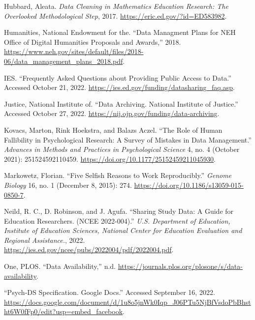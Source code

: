 \documentclass[
]{book}
\newlength{\cslhangindent}
\newlength{\cslentryspacingunit} %
\newenvironment{CSLReferences}[2] %
 {%
  \setlength{\parindent}{0pt}
  \ifodd #1
  \let\oldpar\par
  \def\par{\hangindent=\cslhangindent\oldpar}
  \fi
  \setlength{\parskip}{#2\cslentryspacingunit}
 }%
 {}
\begin{document}
\begin{CSLReferences}{1}{0}
\leavevmode{}%
Hubbard, Aleata. \emph{Data Cleaning in Mathematics Education Research: The Overlooked Methodological Step}, 2017. \url{https://eric.ed.gov/?id=ED583982}.

\leavevmode{}%
Humanities, National Endowment for the. {``Data Managment Plans for {NEH} Office of Digital Humanities Proposals and Awards,''} 2018. \url{https://www.neh.gov/sites/default/files/2018-06/data_management_plans_2018.pdf}.

\leavevmode{}%
IES. {``Frequently Asked Questions about Providing Public Access to Data.''} Accessed October 21, 2022. \url{https://ies.ed.gov/funding/datasharing_faq.asp}.

\leavevmode{}%
Justice, National Institute of. {``Data Archiving. National Institute of Justice.''} Accessed October 27, 2022. \url{https://nij.ojp.gov/funding/data-archiving}.

\leavevmode{}%
Kovacs, Marton, Rink Hoekstra, and Balazs Aczel. {``The Role of Human Fallibility in Psychological Research: A Survey of Mistakes in Data Management.''} \emph{Advances in Methods and Practices in Psychological Science} 4, no. 4 (October 2021): 251524592110459. \url{https://doi.org/10.1177/25152459211045930}.

\leavevmode{}%
Markowetz, Florian. {``Five Selfish Reasons to Work Reproducibly.''} \emph{Genome Biology} 16, no. 1 (December 8, 2015): 274. \url{https://doi.org/10.1186/s13059-015-0850-7}.

\leavevmode{}%
Neild, R. C., D. Robinson, and J. Agufa. {``Sharing Study Data: A Guide for Education Researchers. ({NCEE} 2022-004).''} \emph{U.S. Department of Education, Institute of Education Sciences, National Center for Education Evaluation and Regional Assistance.}, 2022. \url{https://ies.ed.gov/ncee/pubs/2022004/pdf/2022004.pdf}.

\leavevmode{}%
One, PLOS. {``Data Availability,''} n.d. \url{https://journals.plos.org/plosone/s/data-availability}.

\leavevmode{}%
{``Psych-{DS} Specification. Google Docs.''} Accessed September 16, 2022. \url{https://docs.google.com/document/d/1u8o5jnWk0Iqp_J06PTu5NjBfVsdoPbBhstht6W0fFp0/edit?usp=embed_facebook}.


\end{CSLReferences}
\end{document}
